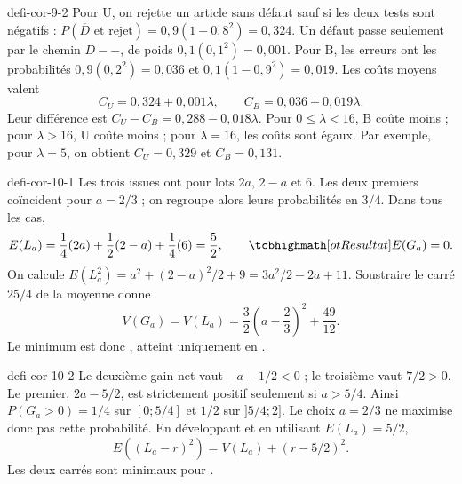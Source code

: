 \begin{blocEdition}{defi-cor-9-2}
Pour U, on rejette un article sans défaut sauf si les deux tests sont négatifs :
$P(\overline D\text{ et rejet})=0{,}9(1-0{,}8^2)=0{,}324$.
Un défaut passe seulement par le chemin $D--$, de poids $0{,}1(0{,}1^2)=0{,}001$.
Pour B, les erreurs ont les probabilités $0{,}9(0{,}2^2)=0{,}036$ et
$0{,}1(1-0{,}9^2)=0{,}019$.
Les coûts moyens valent
\[C_U=0{,}324+0{,}001\lambda,\qquad C_B=0{,}036+0{,}019\lambda.\]
Leur différence est $C_U-C_B=0{,}288-0{,}018\lambda$.
Pour $0\leq\lambda<16$, B coûte moins ; pour $\lambda>16$, U coûte moins ;
pour $\lambda=16$, les coûts sont égaux.
Par exemple, pour $\lambda=5$, on obtient $C_U=0{,}329$ et $C_B=0{,}131$.
\end{blocEdition}

\begin{blocEdition}{defi-cor-10-1}
Les trois issues ont pour lots $2a$, $2-a$ et 6. Les deux premiers coïncident
pour $a=2/3$ ; on regroupe alors leurs probabilités en $3/4$.
Dans tous les cas,
\[E(L_a)=\frac14(2a)+\frac12(2-a)+\frac14(6)=\frac52,\qquad \res{E(G_a)=0}.\]
On calcule $E(L_a^2)=a^2+(2-a)^2/2+9=3a^2/2-2a+11$.
Soustraire le carré $25/4$ de la moyenne donne
\[V(G_a)=V(L_a)=\frac32\left(a-\frac23\right)^2+\frac{49}{12}.\]
Le minimum est donc , atteint uniquement en .

\end{blocEdition}

\begin{blocEdition}{defi-cor-10-2}
Le deuxième gain net vaut $-a-1/2<0$ ; le troisième vaut $7/2>0$.
Le premier, $2a-5/2$, est strictement positif seulement si $a>5/4$.
Ainsi $P(G_a>0)=1/4$ sur $[0;5/4]$ et $1/2$ sur $]5/4;2]$.
Le choix $a=2/3$ ne maximise donc pas cette probabilité.
En développant et en utilisant $E(L_a)=5/2$,
\[E((L_a-r)^2)=V(L_a)+(r-5/2)^2.
\]
Les deux carrés sont minimaux pour .
\label{figedition-defi-cor-10-2-1}
\end{blocEdition}

